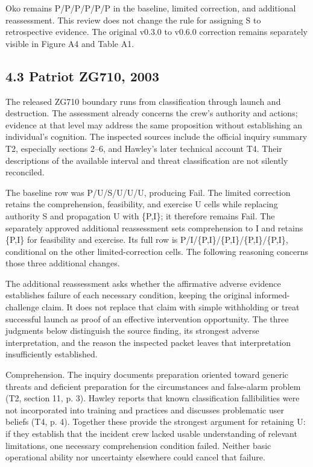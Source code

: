 \documentclass[11pt]{article}
\begin{document}
Oko remains P/P/P/P/P/P in the baseline, limited correction, and additional reassessment. This review does not change the rule for assigning S to retrospective evidence. The original v0.3.0 to v0.6.0 correction remains separately visible in Figure A4 and Table A1.

\subsection*{4.3 Patriot ZG710, 2003}

The released ZG710 boundary runs from classification through launch and destruction. The assessment already concerns the crew’s authority and actions; evidence at that level may address the same proposition without establishing an individual’s cognition. The inspected sources include the official inquiry summary T2, especially sections 2--6, and Hawley’s later technical account T4. Their descriptions of the available interval and threat classification are not silently reconciled.

The baseline row was P/U/S/U/U/U, producing Fail. The limited correction retains the comprehension, feasibility, and exercise U cells while replacing authority S and propagation U with \{P,I\}; it therefore remains Fail. The separately approved additional reassessment sets comprehension to I and retains \{P,I\} for feasibility and exercise. Its full row is P/I/\{P,I\}/\{P,I\}/\{P,I\}/\{P,I\}, conditional on the other limited-correction cells. The following reasoning concerns those three additional changes.

The additional reassessment asks whether the affirmative adverse evidence establishes failure of each necessary condition, keeping the original informed-challenge claim. It does not replace that claim with simple withholding or treat successful launch as proof of an effective intervention opportunity. The three judgments below distinguish the source finding, its strongest adverse interpretation, and the reason the inspected packet leaves that interpretation insufficiently established.

Comprehension. The inquiry documents preparation oriented toward generic threats and deficient preparation for the circumstances and false-alarm problem (T2, section 11, p. 3). Hawley reports that known classification fallibilities were not incorporated into training and practices and discusses problematic user beliefs (T4, p. 4). Together these provide the strongest argument for retaining U: if they establish that the incident crew lacked usable understanding of relevant limitations, one necessary comprehension condition failed. Neither basic operational ability nor uncertainty elsewhere could cancel that failure.
\end{document}

